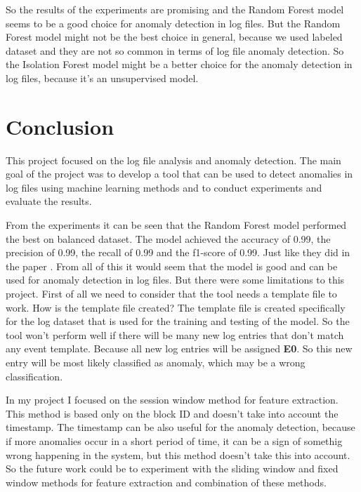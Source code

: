 So the results of the experiments are promising and the Random Forest model seems to be a good choice for anomaly detection in log files. But the Random Forest model might not be the best choice in general, because we 
used labeled dataset and they are not so common in terms of log file anomaly detection. So the Isolation Forest model might be a better choice for the anomaly detection in log files, because it's an unsupervised model. 

\chapter{Conclusion}

This project focused on the log file analysis and anomaly detection.
The main goal of the project was to develop a tool that can be used to detect anomalies in log files using machine learning methods and to conduct experiments and evaluate the results.

From the experiments it can be seen that the Random Forest model performed the best on balanced dataset. The model achieved the accuracy of 0.99, the precision of 0.99, the recall of 0.99 and the f1-score of 0.99.
Just like they did in the paper \cite{goat}.
From all of this it would seem that the model is good and can be used for anomaly detection in log files. But there were some limitations to this project. 
First of all we need to consider that the tool needs a template file to work. How is the template file created? The template file is created specifically for the log dataset that is used for the training and testing of the model.
So the tool won't perform well if there will be many new log entries that don't match any event template. Because all new log entries will be assigned \textbf{E0}. So this new entry will be most likely classified as anomaly, which 
may be a wrong classification.

In my project I focused on the session window method for feature extraction. This method is based only on the block ID and doesn't take into account the timestamp. 
The timestamp can be also useful for the anomaly detection, because if more anomalies occur in a short period of time, it can be a sign of somethig wrong happening in the system, but this method doesn't take this into account. 
So the future work could be to experiment with the sliding window and fixed window methods for feature extraction and combination of these methods.


